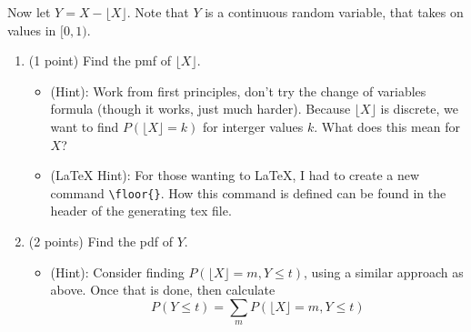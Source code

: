 \documentclass[10pt,twoside]{article}\usepackage[]{graphicx}\usepackage[dvipsnames,svgnames,table]{xcolor}
\newcommand{\floor}[1]{\lfloor #1 \rfloor}
\begin{document}
\begin{enumerate}
    Now let $Y = X - \floor{X}$. Note that $Y$ is a continuous random variable, that takes on values in $[0, 1)$.
    \begin{enumerate}
      \item (1 point) Find the pmf of $\floor{X}$. 
        \begin{itemize}
          \item (Hint): Work from first principles, don't try the change of variables formula (though it works, just much harder). Because $\floor{X}$ is discrete, we want to find $P(\floor{X} = k)$ for interger values $k$. What does this mean for $X$?
          \item (LaTeX Hint): For those wanting to LaTeX, I had to create a new command \texttt{\textbackslash floor\{\}}. How this command is defined can be found in the header of the generating tex file.
        \end{itemize}
      \item (2 points) Find the pdf of $Y$. 
      \begin{itemize}
        \item (Hint): Consider finding $P(\floor{X} = m, Y \leq t)$, using a similar approach as above. Once that is done, then calculate
        $$P(Y \leq t) = \sum_{m} P(\floor{X} = m, Y \leq t)$$
      \end{itemize}
    \end{enumerate}
\end{enumerate}
\end{document}
